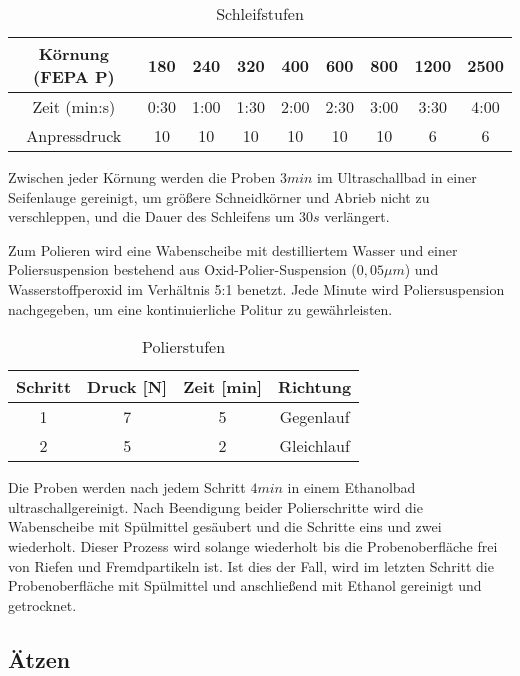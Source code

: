 \begin{table}[h]
	\centering
	\begin{tabular}{|c|c|c|c|c|c|c|c|c|}
		
		\hline 
		Körnung (FEPA P) & 180 & 240 & 320 & 400 & 600 & 800 & 1200 & 2500 \\ 
		\hline 
		Zeit (min:s) & 0:30 & 1:00 & 1:30 & 2:00 & 2:30 & 3:00 & 3:30 & 4:00 \\ 
		\hline 
		Anpressdruck & 10&10&10&10&10&10&6&6\\
		\hline
	\end{tabular} 
		\caption{Schleifstufen}
		\label{tab:Schleifstufen}
\end{table}

Zwischen jeder Körnung werden die Proben $3 min$ im Ultraschallbad in einer Seifenlauge gereinigt, um größere Schneidkörner und Abrieb nicht zu verschleppen, und die Dauer des Schleifens um $30 s$ verlängert. 

Zum Polieren wird eine Wabenscheibe mit destilliertem Wasser und einer Poliersuspension bestehend aus Oxid-Polier-Suspension ($0,05 \mu m$) und Wasserstoffperoxid im Verhältnis 5:1 benetzt. Jede Minute wird Poliersuspension nachgegeben, um eine kontinuierliche Politur zu gewährleisten.

\begin{table}[h]
	\centering

	\begin{tabular}{|c|c|c|c|}
		\hline 
		Schritt & Druck [N] & Zeit [min] & Richtung \\ 
		\hline 
		1 & 7 & 5 & Gegenlauf \\ 
		\hline 
		2 & 5 & 2 & Gleichlauf \\ 
	\hline 
	\end{tabular} 
	\caption{Polierstufen}
	\label{tab:Polierstufen}
\end{table}

Die Proben werden nach jedem Schritt $4 min$ in einem Ethanolbad ultraschallgereinigt. Nach Beendigung beider Polierschritte wird die Wabenscheibe mit Spülmittel gesäubert und die Schritte eins und zwei wiederholt. Dieser Prozess wird solange wiederholt bis die Probenoberfläche frei von Riefen und Fremdpartikeln ist. Ist dies der Fall, wird im letzten Schritt die Probenoberfläche mit Spülmittel und anschließend mit Ethanol gereinigt und getrocknet. 


\subsection{Ätzen}

